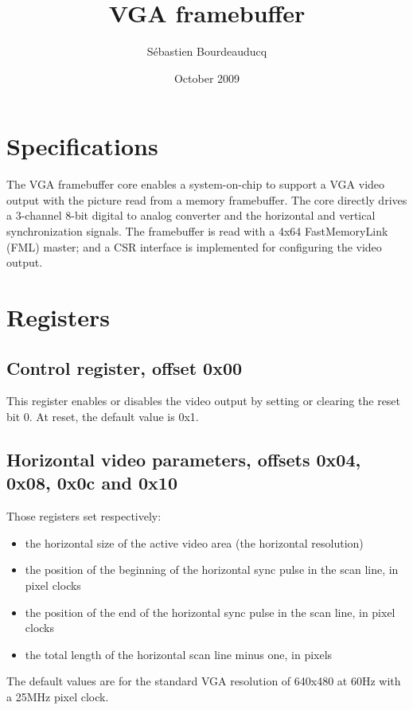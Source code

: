 \documentclass[a4paper,11pt]{article}
\title{VGA framebuffer}
\author{S\'ebastien Bourdeauducq}
\date{October 2009}
\begin{document}
\setlength{\parindent}{0pt}
\setlength{\parskip}{5pt}
\maketitle{}
\section{Specifications}
The VGA framebuffer core enables a system-on-chip to support a VGA video output with the picture read from a memory framebuffer.
The core directly drives a 3-channel 8-bit digital to analog converter and the horizontal and vertical synchronization signals.
The framebuffer is read with a 4x64 FastMemoryLink (FML) master; and a CSR interface is implemented for configuring the video output.

\section{Registers}
\subsection{Control register, offset 0x00}
This register enables or disables the video output by setting or clearing the reset bit 0. At reset, the default value is 0x1.

\subsection{Horizontal video parameters, offsets 0x04, 0x08, 0x0c and 0x10}
Those registers set respectively:
\begin{itemize}
\item the horizontal size of the active video area (the horizontal resolution)
\item the position of the beginning of the horizontal sync pulse in the scan line, in pixel clocks
\item the position of the end of the horizontal sync pulse in the scan line, in pixel clocks
\item the total length of the horizontal scan line minus one, in pixels
\end{itemize}
The default values are for the standard VGA resolution of 640x480 at 60Hz with a 25MHz pixel clock.
\end{document}
